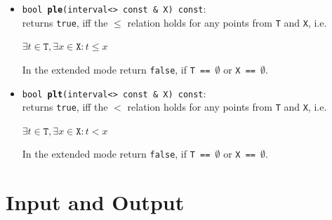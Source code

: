 \documentclass{report}
\begin{document}
\begin{itemize}
			\item \texttt{bool {\bf ple}(interval<> const \& X) const}:\\returns  \texttt{true}, iff the $\leq$ relation holds for any
			points from \texttt{T} and \texttt{X}, i.e.
\begin{center} $\exists t \in \texttt{T},\exists x \in \texttt{X}  :
			t \leq x $\end{center}

In the extended mode return \texttt{false}, if 
				\texttt{T == $\emptyset$} or \texttt{X == $\emptyset$}.

			\item \texttt{bool {\bf plt}(interval<> const \& X)
			const}:\\
returns  \texttt{true}, iff the $<$ relation holds for any
			points from \texttt{T} and \texttt{X}, i.e.
\begin{center} $\exists t \in \texttt{T},\exists x \in \texttt{X}  :
			t < x $\end{center}

In the extended mode return \texttt{false}, if 
				\texttt{T == $\emptyset$} or \texttt{X == $\emptyset$}.
\end{itemize}

\section{Input and Output}\label{iomethods}
\end{document}

